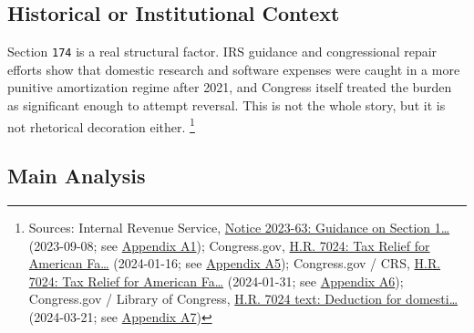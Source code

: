 \documentclass[
  american,
  11pt,
  letterpaper,
]{article}
\begin{document}
\subsection{Historical or Institutional
Context}\label{historical-or-institutional-context-5}

Section \texttt{174} is a real structural factor. IRS guidance and
congressional repair efforts show that domestic research and software
expenses were caught in a more punitive amortization regime after 2021,
and Congress itself treated the burden as significant enough to attempt
reversal. This is not the whole story, but it is not rhetorical
decoration either. \footnote{Sources: Internal Revenue Service,
  \href{https://www.irs.gov/pub/irs-drop/n-23-63.pdf}{Notice 2023-63:
  Guidance on Section 1\ldots{}} (2023-09-08; see
  \hyperref[ch-05-appendix-a1-notice-2023-63-guidance-on-section-174-and-specified-research-or-experimental-expenditures]{Appendix
  A1}); Congress.gov,
  \href{https://www.congress.gov/bill/118th-congress/house-bill/7024}{H.R.
  7024: Tax Relief for American Fa\ldots{}} (2024-01-16; see
  \hyperref[ch-05-appendix-a5-h-r-7024-tax-relief-for-american-families-and-workers-act-of-2024]{Appendix
  A5}); Congress.gov / CRS,
  \href{https://www.congress.gov/bill/118th-congress/house-bill/7024}{H.R.
  7024: Tax Relief for American Fa\ldots{}} (2024-01-31; see
  \hyperref[ch-05-appendix-a6-h-r-7024-tax-relief-for-american-families-and-workers-act-of-2024-crs-summary]{Appendix
  A6}); Congress.gov / Library of Congress,
  \href{https://www.congress.gov/bill/118th-congress/house-bill/7024/text}{H.R.
  7024 text: Deduction for domesti\ldots{}} (2024-03-21; see
  \hyperref[ch-05-appendix-a7-h-r-7024-text-deduction-for-domestic-research-and-experimental-expenditures]{Appendix
  A7})}

\subsection{Main Analysis}\label{main-analysis-5}
\end{document}
